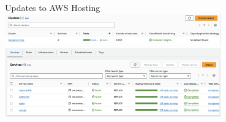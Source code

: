 \begin{frame}{Updates to AWS Hosting}
    \centering
    \includegraphics[height=0.7\textheight,width=0.7\textwidth,keepaspectratio]{images/cluster.png}
    \includegraphics[height=0.7\textheight,width=0.7\textwidth,keepaspectratio]{images/services.png}
\end{frame}
